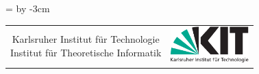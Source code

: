 { %
\footnotesize\sffamily
\newdimen\addresswidth
\addresswidth=\textwidth
\advance\addresswidth by -3cm
\noindent\begin{tabular}{@{}c@{}c@{}}
\parbox{\addresswidth}{Karlsruher Institut für Technologie\\Institut für Theoretische Informatik} & \parbox{3cm}{\includegraphics[width=3cm]{./logos/kit-de.pdf}}
\end{tabular}
} %

\vspace{\baselineskip}

\begin{center}
\makeatletter
{\Large\bfseries\@title\\}
\vspace{\baselineskip}
{
\@author\\
\@subtitle{}\\
\@date
\makeatother
}
\end{center}

\vspace{\baselineskip}
